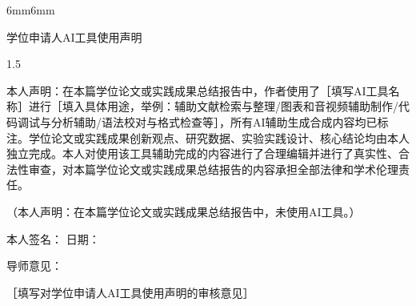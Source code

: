 \begin{titlepage}
\begin{adjustwidth}{6mm}{6mm}

\begin{center}
\heiti 学位申请人AI工具使用声明
\end{center}
\vspace{3mm}
\begin{spacing}{1.5}
\par {\STZhongsong 本人声明：在本篇学位论文或实践成果总结报告中，作者使用了［填写AI工具名称］进行［填入具体用途，举例：辅助文献检索与整理/图表和音视频辅助制作/代码调试与分析辅助/语法校对与格式检查等］，所有AI辅助生成合成内容均已标注。学位论文或实践成果创新观点、研究数据、实验实践设计、核心结论均由本人独立完成。本人对使用该工具辅助完成的内容进行了合理编辑并进行了真实性、合法性审查，对本篇学位论文或实践成果总结报告的内容承担全部法律和学术伦理责任。}
\end{spacing}
\vspace{3mm}
\par {\STZhongsong（本人声明：在本篇学位论文或实践成果总结报告中，未使用AI工具。）}

\vspace{15mm}
\par {\STZhongsong 本人签名：} \hspace{30mm} {\STZhongsong 日期：}

\vspace{20mm}
\par {\STZhongsong 导师意见：} 
\par {\STZhongsong ［填写对学位申请人AI工具使用声明的审核意见］}

\end{adjustwidth}
\end{titlepage}


